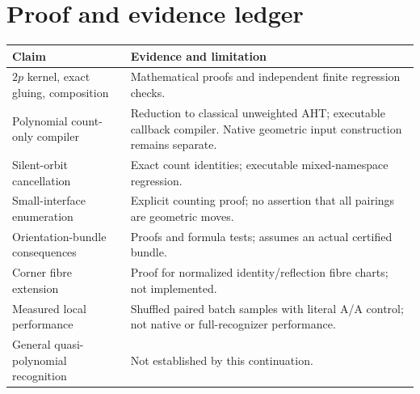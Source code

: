 \documentclass[11pt]{article}
\theoremstyle{definition}
\theoremstyle{remark}\newtheorem{remark}[theorem]{Remark}
\begin{document}
\section{Proof and evidence ledger}
\begin{center}\small
\begin{tabularx}{\textwidth}{@{}lX@{}}\toprule
Claim & Evidence and limitation\\\midrule
$2p$ kernel, exact gluing, composition & Mathematical proofs and independent finite regression checks.\\
Polynomial count-only compiler & Reduction to classical unweighted AHT; executable callback compiler. Native geometric input construction remains separate.\\
Silent-orbit cancellation & Exact count identities; executable mixed-namespace regression.\\
Small-interface enumeration & Explicit counting proof; no assertion that all pairings are geometric moves.\\
Orientation-bundle consequences & Proofs and formula tests; assumes an actual certified bundle.\\
Corner fibre extension & Proof for normalized identity/reflection fibre charts; not implemented.\\
Measured local performance & Shuffled paired batch samples with literal A/A control; not native or full-recognizer performance.\\
General quasi-polynomial recognition & Not established by this continuation.\\\bottomrule
\end{tabularx}
\end{center}
\end{document}
